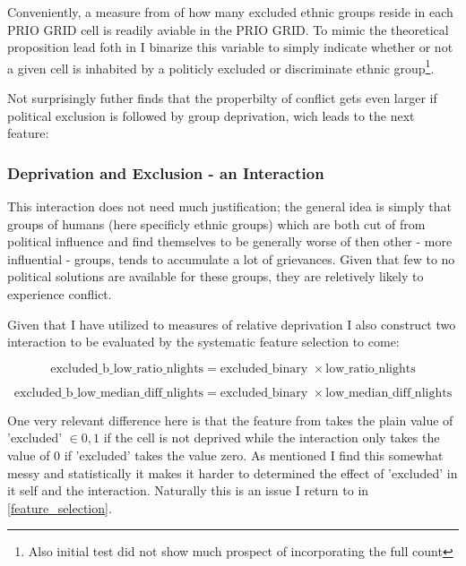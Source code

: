 \documentclass[a4paper]{article}
\begin{document}
Conveniently, a measure from \cite{Girardin_2015} of how many excluded ethnic groups reside in each PRIO GRID cell is readily aviable in the PRIO GRID. To mimic the theoretical proposition lead foth in \cite{Cederman_Gleditsch_Buhaug_2013} I binarize this variable to simply indicate whether or not a given cell is inhabited by a politicly excluded or discriminate ethnic group\footnote{Also initial test did not show much prospect of incorporating the full count}. 


Not surprisingly \cite{Cederman_Gleditsch_Buhaug_2013} futher finds that the properbilty of conflict gets even larger if political exclusion is followed by group deprivation, wich leads to the next feature:

\subsubsection{Deprivation and Exclusion - an Interaction}

This interaction does not need much justification; the general idea is simply that groups of humans (here specificly ethnic groups) which are both cut of from political influence and find themselves to be generally worse of then other - more influential - groups, tends to accumulate a lot of grievances. Given that few to no political solutions are available for these groups, they are reletively likely to experience conflict\cite[103-111]{Cederman_Gleditsch_Buhaug_2013}.\par

Given that I have utilized to measures of relative deprivation I also construct two interaction to be evaluated by the systematic feature selection to come:

$$ \textrm{excluded\_b\_low\_ratio\_nlights} = \textrm{excluded\_binary }\times \textrm{low\_ratio\_nlights} $$

$$ \textrm{excluded\_b\_low\_median\_diff\_nlights} = \textrm{excluded\_binary }\times \textrm{low\_median\_diff\_nlights} $$

One very relevant difference here is that the feature from \cite{Cederman_Gleditsch_Buhaug_2013} takes the plain value of 'excluded' $\in {0,1}$ if the cell is not deprived while the interaction only takes the value of 0 if 'excluded' takes the value zero. As mentioned I find this somewhat messy and statistically it makes it harder to determined the effect of 'excluded' in it self and the interaction. Naturally this is an issue I return to in \autoref{feature_selection}.\par
\end{document}
